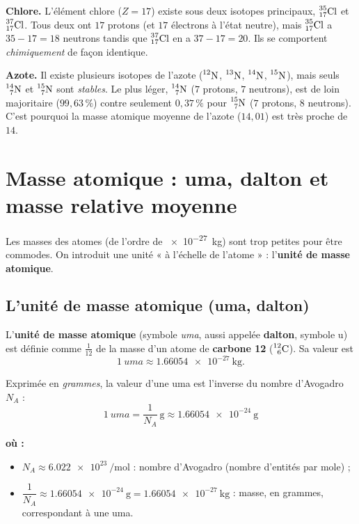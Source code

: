 \documentclass[11pt,a4paper]{article}
\newenvironment{ou}{%
  \par\smallskip\noindent\textbf{où :}\nopagebreak
  \begin{itemize}[leftmargin=1.8em,topsep=2pt,itemsep=1.5pt,parsep=0pt]}%
  {\end{itemize}}
\newcommand{\nuc}[3]{\prescript{#1}{#2}{\mathrm{#3}}}  %
\begin{document}
\begin{exemple}
\textbf{Chlore.} L'élément chlore ($Z = 17$) existe sous deux isotopes principaux, $\nuc{35}{17}{Cl}$ et
$\nuc{37}{17}{Cl}$. Tous deux ont $17$ protons (et $17$ électrons à l'état neutre), mais
$\nuc{35}{17}{Cl}$ a $35 - 17 = 18$ neutrons tandis que $\nuc{37}{17}{Cl}$ en a $37 - 17 = 20$. Ils se
comportent \emph{chimiquement} de façon identique.

\smallskip
\textbf{Azote.} Il existe plusieurs isotopes de l'azote ($\nuc{12}{}{N}$, $\nuc{13}{}{N}$,
$\nuc{14}{}{N}$, $\nuc{15}{}{N}$), mais seuls $\nuc{14}{7}{N}$ et $\nuc{15}{7}{N}$ sont \emph{stables}.
Le plus léger, $\nuc{14}{7}{N}$ ($7$ protons, $7$ neutrons), est de loin majoritaire ($99{,}63\,\%$)
contre seulement $0{,}37\,\%$ pour $\nuc{15}{7}{N}$ ($7$ protons, $8$ neutrons). C'est pourquoi la masse
atomique moyenne de l'azote ($14{,}01$) est très proche de $14$.
\end{exemple}

\section{Masse atomique : uma, dalton et masse relative moyenne}\label{sec:masse}
Les masses des atomes (de l'ordre de \SI{e-27}{\kilo\gram}) sont trop petites pour être commodes. On
introduit une unité « à l'échelle de l'atome » : l'\textbf{unité de masse atomique}.

\subsection{L'unité de masse atomique (uma, dalton)}

\begin{definition}
L'\textbf{unité de masse atomique} (symbole \emph{uma}, aussi appelée \textbf{dalton}, symbole u) est
définie comme \(\tfrac{1}{12}\) de la masse d'un atome de \textbf{carbone 12} ($\nuc{12}{6}{C}$).
Sa valeur est
\[ \SI{1}{uma} \approx \SI{1,66054e-27}{\kilo\gram}. \]
\end{definition}

\begin{formule}
Exprimée en \emph{grammes}, la valeur d'une uma est l'inverse du nombre d'Avogadro $N_{\!A}$ :
\[ \boxed{\ \SI{1}{uma} = \dfrac{1}{N_{\!A}}\ \si{\gram} \approx \SI{1,66054e-24}{\gram}\ } \]
\begin{ou}
  \item $N_{\!A} \approx \SI{6,022e23}{\per\mole}$ : nombre d'Avogadro (nombre d'entités par mole) ;
  \item $\dfrac{1}{N_{\!A}} \approx \SI{1,66054e-24}{\gram} = \SI{1,66054e-27}{\kilo\gram}$ : masse, en
        grammes, correspondant à une uma.
\end{ou}
\end{formule}
\end{document}
